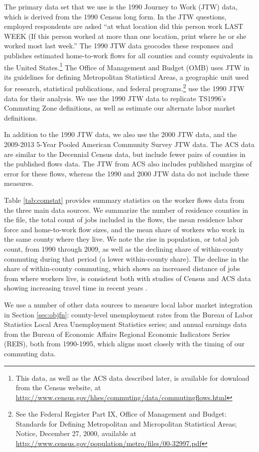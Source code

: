 The primary data set that we use is the 1990 Journey to Work (JTW) data, which is derived from the 1990 Census long form. In the JTW questions, employed respondents are asked ``at what location did this person work LAST WEEK (If this person worked at more than one location, print where he or she worked most last week.'' The 1990 JTW data geocodes these responses and publishes estimated home-to-work flows for all counties and county equivalents in the United States.\footnote{This data, as well as the ACS data described later, is available for download from the Census website, at \url{http://www.census.gov/hhes/commuting/data/commutingflows.html}} The Office of Management and Budget (OMB) uses JTW in its guidelines for defining Metropolitan Statistical Areas, a geographic unit used for research, statistical publications, and federal programs.\footnote{See the Federal Register Part IX, Office of Management and Budget: Standards for Defining Metropolitan and Micropolitan Statistical Areas; Notice, December 27, 2000, available  at \url{http://www.census.gov/population/metro/files/00-32997.pdf}} \citet{TS1996} use the 1990 JTW data for their analysis. We use the 1990 JTW data to replicate TS1996's Commuting Zone definitions, as well as estimate our alternate labor market definitions. 

In addition to the 1990 JTW data, we also use the 2000 JTW data, and the 2009-2013 5-Year Pooled American Community Survey JTW data. The ACS data are similar to the Decennial Census data, but include fewer pairs of counties in the published flows data. The JTW from ACS also includes published margins of error for these flows, whereas the 1990  and 2000 JTW data do not include these measures.

Table \ref{tab:comstat} provides summary statistics on the worker flows data from the three main data sources. We summarize the number of residence counties in the file, the total count of jobs included in the flows, the mean residence labor force and home-to-work flow sizes, and the mean share of workers who work in the same county where  they live. We note the rise in population, or total job count, from 1990 through 2009, as well as the declining share of within-county commuting during that period (a lower within-county share). The decline in the share of within-county commuting, which shows an increased distance of jobs from where workers live, is consistent both with studies of Census and ACS data showing increasing travel time in recent years \citep{ACS2011}. 

We use a number of other data sources to measure local labor market integration in Section \ref{sec:objfn}: county-level unemployment rates from the Bureau of Labor Statistics Local Area Unemployment Statistics series; and annual earnings data from the Bureau of Economic Affairs Regional Economic Indicators Series (REIS), both from 1990-1995, which aligns most closely with the timing of our commuting data.


